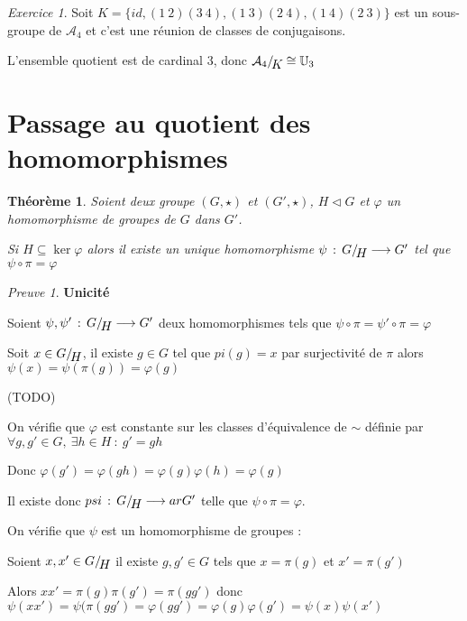 \documentclass[]{article}
\newtheorem{mythm}{Théorème}
\theoremstyle{remark}
\newtheorem{myexer}{Exercice}
\newtheorem{myproof}{Preuve}
\theoremstyle{definition}
\newcommand{\funcshort}[3]{
#1 \, : \, #2 \longrightarrow #3
}
\newenvironment{proofpart}[1]{
	\noindent
	{\textbf{\boldmath #1}}
}{
	\checkmark
}
\newcommand*{\ClGa}[2]%
{\ensuremath{%
    #1/\!\raisebox{-.65ex}{\ensuremath{#2}}}}
\begin{document}
\begin{myexer}
	Soit $K=\{id, (1~2)(3~4),(1~3)(2~4),(1~4)(2~3)\}$ est un sous-groupe de $\mathcal{A}_4$ et c'est une réunion de classes de conjugaisons.
	
	L'ensemble quotient est de cardinal 3, donc $\ClGa{\mathcal{A}_4}{K} \cong \mathbb{U}_3$
\end{myexer}

\section{Passage au quotient des homomorphismes}

\begin{mythm}
	Soient deux groupe $(G, \star)$ et $(G', \star)$, $H \vartriangleleft G$  et $\varphi$ un homomorphisme de groupes de $G$ dans $G'$.
	
	Si $H \subseteq \ker \varphi$ alors il existe un unique homomorphisme $\funcshort{\psi}{\ClGa{G}{H}}{G'}$ tel que $\psi \circ \pi = \varphi$
\end{mythm}

\begin{myproof}
	\begin{proofpart}{Unicité}

		Soient $\funcshort{\psi, \psi'}{\ClGa{G}{H}}{G'}$ deux homomorphismes tels que $\psi \circ \pi = \psi' \circ \pi = \varphi$
		
		Soit $x \in \ClGa{G}{H}$, il existe $g \in G$ tel que $pi(g) = x$ par surjectivité de $\pi$ alors $\psi(x) = \psi(\pi(g)) = \varphi(g) $ 
		
		(TODO)
	\end{proofpart}
	
	\begin{proofpart}{}
		
		On vérifie que $\varphi$ est constante sur les classes d'équivalence de $\sim$ définie par $\forall g, g' \in G, ~ \exists h \in H ~ : ~ g' = g h$
		
		Donc $\varphi(g') = \varphi(gh)=\varphi(g)\varphi(h)=\varphi(g)$
		
		Il existe donc $\funcshort{psi}{\ClGa{G}{H}}{arG'}$ telle que $\psi \circ \pi = \varphi$.
		
		On vérifie que $\psi$ est un homomorphisme de groupes :
		
		Soient $x, x' \in \ClGa{G}{H}$ il existe $g, g' \in G$ tels que $x = \pi(g)$ et $x'=\pi(g')$
		
		Alors $x x' = \pi(g)\pi(g') = \pi(gg')$ donc $\psi(x x') = \psi(\pi(gg')=\varphi(gg')=\varphi(g)\varphi(g')=\psi(x)\psi(x')$
	\end{proofpart}
\end{myproof}
\end{document}
